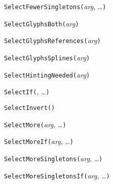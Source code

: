 
\texttt{SelectFewerSingletons(}\textit{arg}, \ldots\texttt{)}



\texttt{SelectGlyphsBoth(}\textit{arg}\texttt{)}



\texttt{SelectGlyphsReferences(}\textit{arg}\texttt{)}



\texttt{SelectGlyphsSplines(}\textit{arg}\texttt{)}



\texttt{SelectHintingNeeded(}\textit{arg}\texttt{)}



\texttt{SelectIf(}, \ldots\texttt{)}



\texttt{SelectInvert(}\texttt{)}



\texttt{SelectMore(}\textit{arg}, \ldots\texttt{)}



\texttt{SelectMoreIf(}\textit{arg}, \ldots\texttt{)}



\texttt{SelectMoreSingletons(}\textit{arg}, \ldots\texttt{)}



\texttt{SelectMoreSingletonsIf(}\textit{arg}, \ldots\texttt{)}


